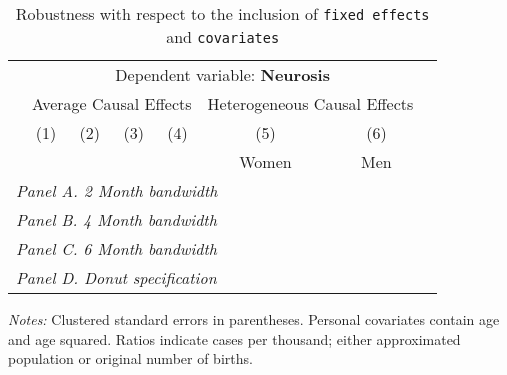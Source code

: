  \begin{table}[H] \begin{threeparttable} \centering \caption{Robustness with respect to the inclusion of \texttt{fixed effects} and \texttt{covariates}} {\def\sym#1{\ifmmode^{#1}\else\(^{#1}\)\fi} \begin{tabular}{l*{7}{c}} \toprule & \multicolumn{6}{c}{Dependent variable: \textbf{Neurosis}} \\ \cmidrule(lr){2-7}
            &\multicolumn{4}{c}{Average Causal Effects}         &\multicolumn{2}{c}{Heterogeneous Causal Effects}\\\cmidrule(lr){2-5}\cmidrule(lr){6-7}
            &\multicolumn{1}{c}{(1)}&\multicolumn{1}{c}{(2)}&\multicolumn{1}{c}{(3)}&\multicolumn{1}{c}{(4)}&\multicolumn{1}{c}{(5)}&\multicolumn{1}{c}{(6)}\\
            &\multicolumn{1}{c}{}&\multicolumn{1}{c}{}&\multicolumn{1}{c}{}&\multicolumn{1}{c}{}&\multicolumn{1}{c}{Women}&\multicolumn{1}{c}{Men}\\
\midrule
 \multicolumn{7}{l}{\emph{Panel A. 2 Month bandwidth}} \\    \midrule\multicolumn{7}{l}{\emph{Panel B. 4 Month bandwidth}} \\    \midrule\multicolumn{7}{l}{\emph{Panel C. 6 Month bandwidth}} \\    \midrule\multicolumn{7}{l}{\emph{Panel D. Donut specification}} \\    \midrule  
\bottomrule \end{tabular} } \begin{tablenotes} \item \scriptsize \emph{Notes:} Clustered standard errors in parentheses. Personal covariates contain age and age squared. Ratios indicate cases per thousand; either approximated population or original number of births. \end{tablenotes} \end{threeparttable} \end{table} 
